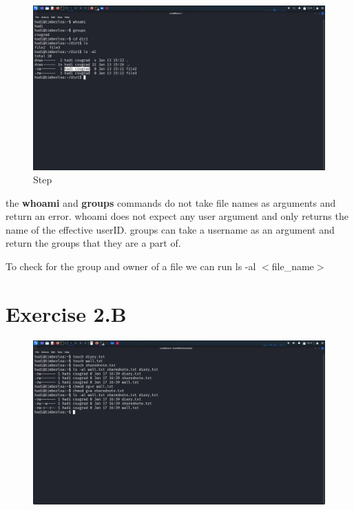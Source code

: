 \documentclass{article}
\numberwithin{equation}{subsection}
\begin{document}
	\begin{figure}[H]
		\caption{Step}
		\includegraphics[width=450pt]{images/e2qA/2.png}
	\end{figure}

	\par{
		the \textbf{whoami} and \textbf{groups} commands do not take file names as
		arguments and return an error. whoami does not expect any user argument and
		only returns the name of the effective userID. groups can take a username
		as an argument and return the groups that they are a part of.
	
	To check for the group and owner of a file we can run ls -al $<$file\_name$>$
	}

	\newpage
	\section{Exercise 2.B}
	
	\begin{figure}[H]
		\includegraphics[width=400pt]{images/e2qB/e2.png}
	\end{figure}
\end{document}
